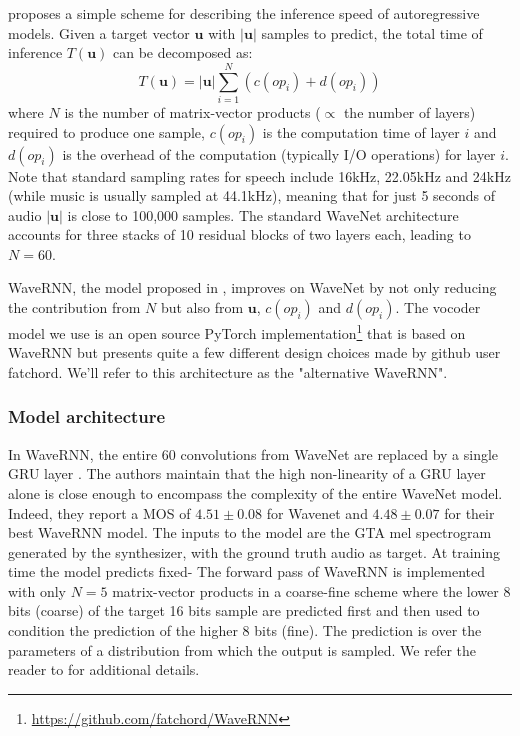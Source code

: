 \documentclass[a4paper, oneside, 12pt, english]{article}
\begin{document}
\citep{WaveRNN} proposes a simple scheme for describing the inference speed of autoregressive models. Given a target vector $\mathbf{u}$ with $|\mathbf{u}|$ samples to predict, the total time of inference $T(\mathbf{u})$ can be decomposed as:
$$ T(\mathbf{u}) = |\mathbf{u}|\sum_{i=1}^{N}(c(op_i) + d(op_i)) $$
where $N$ is the number of matrix-vector products ($\propto$ the number of layers) required to produce one sample, $c(op_i)$ is the computation time of layer $i$ and $d(op_i)$ is the overhead of the computation (typically I/O operations) for layer $i$. Note that standard sampling rates for speech include 16kHz, 22.05kHz and 24kHz (while music is usually sampled at 44.1kHz), meaning that for just 5 seconds of audio $|\mathbf{u}|$ is close to 100,000 samples. The standard WaveNet architecture accounts for three stacks of 10 residual blocks of two layers each, leading to $N = 60$. 

WaveRNN, the model proposed in \citep{WaveRNN}, improves on WaveNet by not only reducing the contribution from $N$ but also from $\mathbf{u}$, $c(op_i)$ and $d(op_i)$. The vocoder model we use is an open source PyTorch implementation\footnote{\url{https://github.com/fatchord/WaveRNN}} that is based on WaveRNN but presents quite a few different design choices made by github user fatchord. We'll refer to this architecture as the "alternative WaveRNN".

\subsubsection{Model architecture}
In WaveRNN, the entire 60 convolutions from WaveNet are replaced by a single GRU layer \citep{GRU}. The authors maintain that the high non-linearity of a GRU layer alone is close enough to encompass the complexity of the entire WaveNet model. Indeed, they report a MOS of $4.51 \pm 0.08$ for Wavenet and $4.48 \pm 0.07$ for their best WaveRNN model. The inputs to the model are the GTA mel spectrogram generated by the synthesizer, with the ground truth audio as target. At training time the model predicts fixed- The forward pass of WaveRNN is implemented with only $N = 5$ matrix-vector products in a coarse-fine scheme where the lower 8 bits (coarse) of the target 16 bits sample are predicted first and then used to condition the prediction of the higher 8 bits (fine). The prediction is over the parameters of a distribution from which the output is sampled. We refer the reader to \citep{WaveRNN} for additional details.
\end{document}
